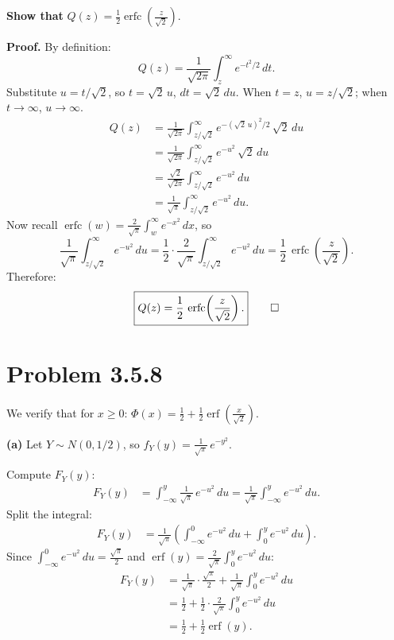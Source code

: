 \documentclass[11pt]{article}
\newcommand{\erfc}{\operatorname{erfc}}
\newcommand{\erf}{\operatorname{erf}}
\begin{document}
\textbf{Show that} $Q(z)=\frac{1}{2}\erfc\!\left(\frac{z}{\sqrt{2}}\right)$.

\medskip
\textbf{Proof.} By definition:
\[
Q(z) = \frac{1}{\sqrt{2\pi}}\int_z^{\infty} e^{-t^2/2}\,dt.
\]
Substitute $u = t/\sqrt{2}$, so $t=\sqrt{2}\,u$, $dt=\sqrt{2}\,du$.
When $t=z$, $u=z/\sqrt{2}$; when $t\to\infty$, $u\to\infty$.
\begin{align*}
Q(z) &= \frac{1}{\sqrt{2\pi}}\int_{z/\sqrt{2}}^{\infty} e^{-(\sqrt{2}\,u)^2/2}\,\sqrt{2}\,du\\
&= \frac{1}{\sqrt{2\pi}}\int_{z/\sqrt{2}}^{\infty} e^{-u^2}\,\sqrt{2}\,du\\
&= \frac{\sqrt{2}}{\sqrt{2\pi}}\int_{z/\sqrt{2}}^{\infty} e^{-u^2}\,du\\
&= \frac{1}{\sqrt{\pi}}\int_{z/\sqrt{2}}^{\infty} e^{-u^2}\,du.
\end{align*}
Now recall $\erfc(w)=\frac{2}{\sqrt{\pi}}\int_w^{\infty}e^{-x^2}\,dx$, so
\[
\frac{1}{\sqrt{\pi}}\int_{z/\sqrt{2}}^{\infty}e^{-u^2}\,du = \frac{1}{2}\cdot\frac{2}{\sqrt{\pi}}\int_{z/\sqrt{2}}^{\infty}e^{-u^2}\,du = \frac{1}{2}\,\erfc\!\left(\frac{z}{\sqrt{2}}\right).
\]
Therefore:
\[
\boxed{Q(z)=\frac{1}{2}\,\erfc\!\left(\frac{z}{\sqrt{2}}\right).} \qed
\]

\section*{Problem 3.5.8}

We verify that for $x\ge 0$: $\Phi(x)=\frac{1}{2}+\frac{1}{2}\erf\!\left(\frac{x}{\sqrt{2}}\right)$.

\medskip
\textbf{(a)} Let $Y\sim N(0,1/2)$, so $f_Y(y)=\frac{1}{\sqrt{\pi}}\,e^{-y^2}$.

Compute $F_Y(y)$:
\begin{align*}
F_Y(y) &= \int_{-\infty}^{y}\frac{1}{\sqrt{\pi}}\,e^{-u^2}\,du = \frac{1}{\sqrt{\pi}}\int_{-\infty}^{y}e^{-u^2}\,du.
\end{align*}
Split the integral:
\begin{align*}
F_Y(y) &= \frac{1}{\sqrt{\pi}}\left(\int_{-\infty}^{0}e^{-u^2}\,du + \int_0^{y}e^{-u^2}\,du\right).
\end{align*}
Since $\int_{-\infty}^{0}e^{-u^2}\,du = \frac{\sqrt{\pi}}{2}$ and $\erf(y)=\frac{2}{\sqrt{\pi}}\int_0^y e^{-u^2}\,du$:
\begin{align*}
F_Y(y) &= \frac{1}{\sqrt{\pi}}\cdot\frac{\sqrt{\pi}}{2} + \frac{1}{\sqrt{\pi}}\int_0^y e^{-u^2}\,du\\
&= \frac{1}{2}+\frac{1}{2}\cdot\frac{2}{\sqrt{\pi}}\int_0^y e^{-u^2}\,du\\
&= \boxed{\frac{1}{2}+\frac{1}{2}\erf(y)}.
\end{align*}
\end{document}

